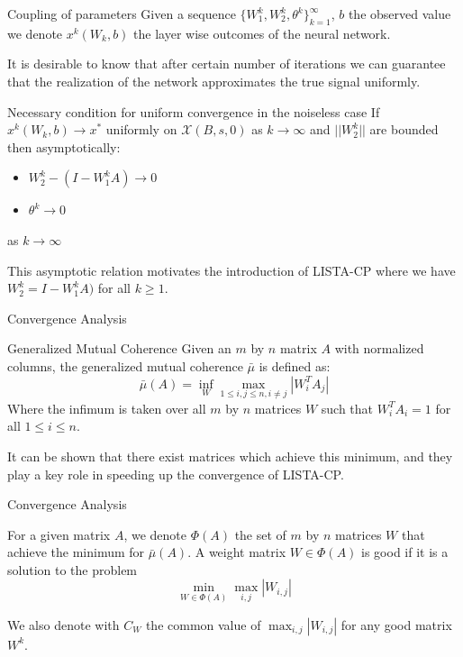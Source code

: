 \documentclass{beamer}
\begin{document}
\begin{frame}{Coupling of parameters}
Given a sequence $\{W_1^k,W_2^k,\theta^k\}_{k=1}^{\infty}$, $b$ the observed value we denote $x^k(W_k,b)$ the layer wise outcomes of the neural network.

It is desirable to know that after certain number of iterations we can guarantee that the realization of the network approximates the true signal uniformly.

\begin{block}{Necessary condition for uniform convergence in the noiseless case}
If $x^k(W_k,b)\rightarrow x^*$ uniformly on $\mathcal{X}(B,s,0)$ as $k\rightarrow\infty$ and $||W_2^k||$ are bounded then asymptotically:
\begin{itemize}
    \item $W_2^k-(I-W_1^kA)\rightarrow 0$
    \item $\theta^k\rightarrow 0$
\end{itemize}
as $k\rightarrow\infty$



\end{block}
This asymptotic relation motivates the introduction of LISTA-CP
where we have $W_2^k=I-W_1^kA)$ for all $k\geq 1$.
\end{frame}

\begin{frame}{Convergence Analysis}
\begin{block}{Generalized Mutual Coherence}
    Given an $m$ by $n$ matrix $A$ with normalized columns,
    the generalized mutual coherence $\bar{\mu}$ is defined as:
    \begin{equation*}
        \bar{\mu}(A)=\inf_{W} \max_{1\leq i,j\leq n, i\neq j} |W_i^TA_j|
    \end{equation*}
    Where the infimum is taken over all $m$ by $n$ matrices $W$ such that $W_i^TA_i=1$ for all $1\leq i\leq n$.
\end{block}
It can be shown that there exist matrices which achieve this minimum, and they play a key role in speeding up the convergence of LISTA-CP.

\end{frame}

\begin{frame}{Convergence Analysis}

For a given matrix $A$, we denote $\Phi(A)$ the set of
$m$ by $n$ matrices $W$ that achieve the minimum for $\bar{\mu}(A)$. A weight matrix $W\in\Phi(A)$ is good if it is a solution to the problem
\begin{equation*}
    \min_{W\in\Phi(A)} \max_{i,j} |W_{i,j}|
\end{equation*}

We also denote with $C_W$ the common value of $\max_{i,j}|W_{i,j}|$ for any good matrix $W^k$.
\end{frame}
\end{document}
